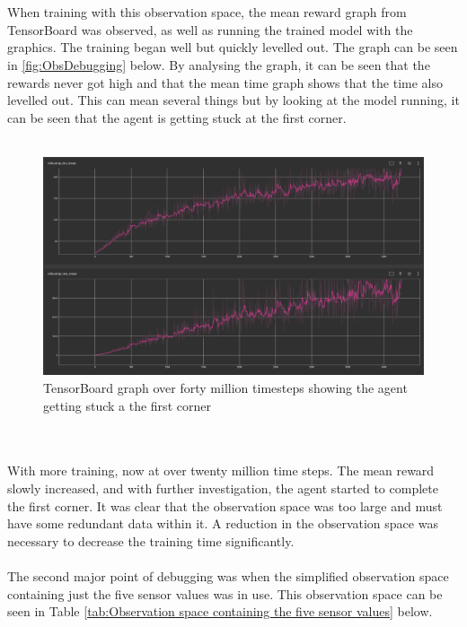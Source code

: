 \documentclass[a4paper,12pt]{article}
\begin{document}
\\\\
When training with this observation space, the mean reward graph from TensorBoard was observed, as well as running the trained model with the graphics. The training began well but quickly levelled out. The graph can be seen in \autoref{fig:ObsDebugging} below. By analysing the graph, it can be seen that the rewards never got high and that the mean time graph shows that the time also levelled out. This can mean several things but by looking at the model running, it can be seen that the agent is getting stuck at the first corner.
\\\\
\begin{figure}[H]
\centering
\includegraphics[width=15cm]{imgs/ObsDebugging.png}
\caption{TensorBoard graph over forty million timesteps showing the agent getting stuck a the first corner}
\label{fig:ObsDebugging}
\end{figure}
\\\\
With more training, now at over twenty million time steps. The mean reward slowly increased, and with further investigation, the agent started to complete the first corner. It was clear that the observation space was too large and must have some redundant data within it. A reduction in the observation space was necessary to decrease the training time significantly. 
\\\\
The second major point of debugging was when the simplified observation space containing just the five sensor values was in use. This observation space can be seen in Table \ref{tab:Observation space containing the five sensor values} below. 
\\\\
\end{document}
